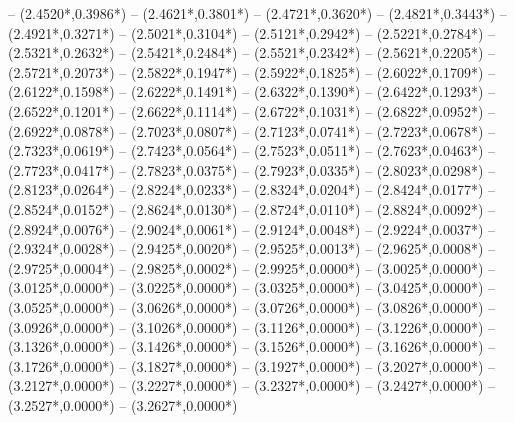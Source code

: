 {	-- ({2.4520*\dx},{0.3986*\dy})
	-- ({2.4621*\dx},{0.3801*\dy})
	-- ({2.4721*\dx},{0.3620*\dy})
	-- ({2.4821*\dx},{0.3443*\dy})
	-- ({2.4921*\dx},{0.3271*\dy})
	-- ({2.5021*\dx},{0.3104*\dy})
	-- ({2.5121*\dx},{0.2942*\dy})
	-- ({2.5221*\dx},{0.2784*\dy})
	-- ({2.5321*\dx},{0.2632*\dy})
	-- ({2.5421*\dx},{0.2484*\dy})
	-- ({2.5521*\dx},{0.2342*\dy})
	-- ({2.5621*\dx},{0.2205*\dy})
	-- ({2.5721*\dx},{0.2073*\dy})
	-- ({2.5822*\dx},{0.1947*\dy})
	-- ({2.5922*\dx},{0.1825*\dy})
	-- ({2.6022*\dx},{0.1709*\dy})
	-- ({2.6122*\dx},{0.1598*\dy})
	-- ({2.6222*\dx},{0.1491*\dy})
	-- ({2.6322*\dx},{0.1390*\dy})
	-- ({2.6422*\dx},{0.1293*\dy})
	-- ({2.6522*\dx},{0.1201*\dy})
	-- ({2.6622*\dx},{0.1114*\dy})
	-- ({2.6722*\dx},{0.1031*\dy})
	-- ({2.6822*\dx},{0.0952*\dy})
	-- ({2.6922*\dx},{0.0878*\dy})
	-- ({2.7023*\dx},{0.0807*\dy})
	-- ({2.7123*\dx},{0.0741*\dy})
	-- ({2.7223*\dx},{0.0678*\dy})
	-- ({2.7323*\dx},{0.0619*\dy})
	-- ({2.7423*\dx},{0.0564*\dy})
	-- ({2.7523*\dx},{0.0511*\dy})
	-- ({2.7623*\dx},{0.0463*\dy})
	-- ({2.7723*\dx},{0.0417*\dy})
	-- ({2.7823*\dx},{0.0375*\dy})
	-- ({2.7923*\dx},{0.0335*\dy})
	-- ({2.8023*\dx},{0.0298*\dy})
	-- ({2.8123*\dx},{0.0264*\dy})
	-- ({2.8224*\dx},{0.0233*\dy})
	-- ({2.8324*\dx},{0.0204*\dy})
	-- ({2.8424*\dx},{0.0177*\dy})
	-- ({2.8524*\dx},{0.0152*\dy})
	-- ({2.8624*\dx},{0.0130*\dy})
	-- ({2.8724*\dx},{0.0110*\dy})
	-- ({2.8824*\dx},{0.0092*\dy})
	-- ({2.8924*\dx},{0.0076*\dy})
	-- ({2.9024*\dx},{0.0061*\dy})
	-- ({2.9124*\dx},{0.0048*\dy})
	-- ({2.9224*\dx},{0.0037*\dy})
	-- ({2.9324*\dx},{0.0028*\dy})
	-- ({2.9425*\dx},{0.0020*\dy})
	-- ({2.9525*\dx},{0.0013*\dy})
	-- ({2.9625*\dx},{0.0008*\dy})
	-- ({2.9725*\dx},{0.0004*\dy})
	-- ({2.9825*\dx},{0.0002*\dy})
	-- ({2.9925*\dx},{0.0000*\dy})
	-- ({3.0025*\dx},{0.0000*\dy})
	-- ({3.0125*\dx},{0.0000*\dy})
	-- ({3.0225*\dx},{0.0000*\dy})
	-- ({3.0325*\dx},{0.0000*\dy})
	-- ({3.0425*\dx},{0.0000*\dy})
	-- ({3.0525*\dx},{0.0000*\dy})
	-- ({3.0626*\dx},{0.0000*\dy})
	-- ({3.0726*\dx},{0.0000*\dy})
	-- ({3.0826*\dx},{0.0000*\dy})
	-- ({3.0926*\dx},{0.0000*\dy})
	-- ({3.1026*\dx},{0.0000*\dy})
	-- ({3.1126*\dx},{0.0000*\dy})
	-- ({3.1226*\dx},{0.0000*\dy})
	-- ({3.1326*\dx},{0.0000*\dy})
	-- ({3.1426*\dx},{0.0000*\dy})
	-- ({3.1526*\dx},{0.0000*\dy})
	-- ({3.1626*\dx},{0.0000*\dy})
	-- ({3.1726*\dx},{0.0000*\dy})
	-- ({3.1827*\dx},{0.0000*\dy})
	-- ({3.1927*\dx},{0.0000*\dy})
	-- ({3.2027*\dx},{0.0000*\dy})
	-- ({3.2127*\dx},{0.0000*\dy})
	-- ({3.2227*\dx},{0.0000*\dy})
	-- ({3.2327*\dx},{0.0000*\dy})
	-- ({3.2427*\dx},{0.0000*\dy})
	-- ({3.2527*\dx},{0.0000*\dy})
	-- ({3.2627*\dx},{0.0000*\dy})
}

